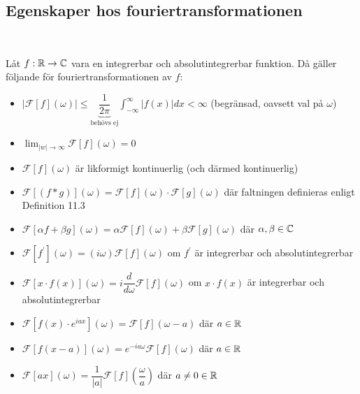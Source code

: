 \subsection{Egenskaper hos fouriertransformationen}\hfill\\\par
\noindent Låt $f:\mathbb{R}\to\mathbb{C}$ vara en integrerbar och absolutintegrerbar funktion. Då gäller följande för fouriertransformationen av $f$:\par
\begin{itemize}
  \item $\left|\mathcal{F}[f](\omega)\right|\leq \underbrace{\dfrac{1}{2\pi}}_{\text{behövs ej}}\int_{-\infty}^{\infty}\left|f(x)\right|dx<\infty$ (begränsad, oavsett val på $\omega$)
    \par\bigskip
  \item $\lim_{\left|w\right|\to\infty}\mathcal{F}[f](\omega) = 0$
    \par\bigskip
  \item $\mathcal{F}[f](\omega)$ är likformigt kontinuerlig (och därmed kontinuerlig)
    \par\bigskip
  \item $\mathcal{F}[(f*g)](\omega) = \mathcal{F}[f](\omega)\cdot\mathcal{F}[g](\omega)$ där faltningen definieras enligt Definition 11.3
    \par\bigskip
  \item $\mathcal{F}[\alpha f+\beta g](\omega) = \alpha\mathcal{F}[f](\omega)+\beta\mathcal{F}[g](\omega)$ där $\alpha, \beta\in\mathbb{C}$
    \par\bigskip
  \item $\mathcal{F}[f^{\prime}](\omega) = (i\omega)\mathcal{F}[f](\omega)$ om $f^{\prime}$ är integrerbar och absolutintegrerbar
    \par\bigskip
  \item $\mathcal{F}[x\cdot f(x)](\omega) = i\dfrac{d}{d\omega}\mathcal{F}[f](\omega)$ om $x\cdot f(x)$ är integrerbar och absolutintegrerbar
    \par\bigskip
  \item $\mathcal{F}[f(x)\cdot e^{iax}](\omega) = \mathcal{F}[f](\omega-a)$ där $a\in\mathbb{R}$
    \par\bigskip
  \item $\mathcal{F}[f(x-a)](\omega) = e^{-ia\omega}\mathcal{F}[f](\omega)$ där $a\in\mathbb{R}$
    \par\bigskip
  \item $\mathcal{F}[ax](\omega) = \dfrac{1}{\left|a\right|}\mathcal{F}[f]\left(\dfrac{\omega}{a}\right)$ där $a\neq0\in\mathbb{R}$
\end{itemize}
\par\bigskip
\par\bigskip


